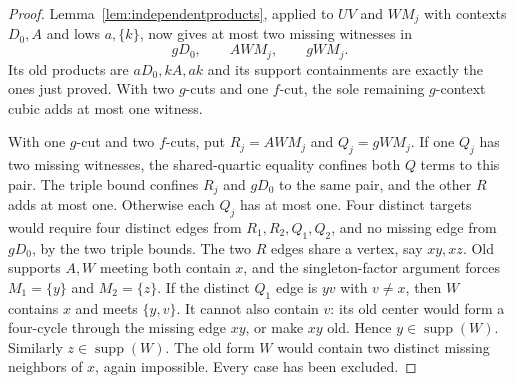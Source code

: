 \documentclass[11pt]{article}
\newcommand{\supp}{\operatorname{supp}}
\theoremstyle{definition}
\theoremstyle{remark}
\begin{document}
\begin{proof}
Lemma~\ref{lem:independentproducts}, applied to $UV$ and $WM_j$ with contexts $D_0,A$ and lows $a,\{k\}$, now gives at most two missing witnesses in
\[
 gD_0,\qquad AWM_j,\qquad gWM_j.
\]
Its old products are $aD_0,kA,ak$ and its support containments are exactly the ones just proved. With two $g$-cuts and one $f$-cut, the sole remaining $g$-context cubic adds at most one witness.

With one $g$-cut and two $f$-cuts, put $R_j=AWM_j$ and $Q_j=gWM_j$. If one $Q_j$ has two missing witnesses, the shared-quartic equality confines both $Q$ terms to this pair. The triple bound confines $R_j$ and $gD_0$ to the same pair, and the other $R$ adds at most one. Otherwise each $Q_j$ has at most one. Four distinct targets would require four distinct edges from $R_1,R_2,Q_1,Q_2$, and no missing edge from $gD_0$, by the two triple bounds. The two $R$ edges share a vertex, say $xy,xz$. Old supports $A,W$ meeting both contain $x$, and the singleton-factor argument forces $M_1=\{y\}$ and $M_2=\{z\}$. If the distinct $Q_1$ edge is $yv$ with $v\ne x$, then $W$ contains $x$ and meets $\{y,v\}$. It cannot also contain $v$: its old center would form a four-cycle through the missing edge $xy$, or make $xy$ old. Hence $y\in\supp(W)$. Similarly $z\in\supp(W)$. The old form $W$ would contain two distinct missing neighbors of $x$, again impossible. Every case has been excluded.
\end{proof}
\end{document}

